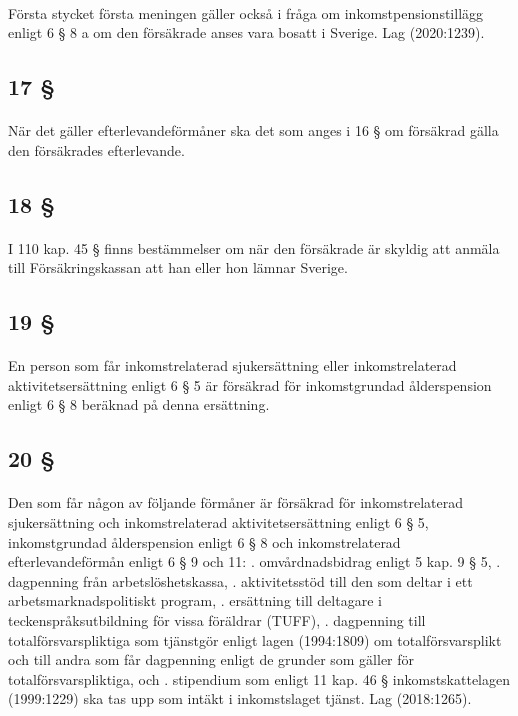 \documentclass[a4paper,notitlepage,openany,10pt]{book}
\begin{document}
\paragraph*{}
Första stycket första meningen gäller också i fråga om inkomstpensionstillägg enligt 6 § 8 a om den försäkrade anses vara bosatt i Sverige.
Lag (2020:1239).
\subsection*{17 §}
\paragraph*{}
När det gäller efterlevandeförmåner ska det som anges i 16 § om försäkrad gälla den försäkrades efterlevande.
\subsection*{18 §}
\paragraph*{}
I 110 kap. 45 § finns bestämmelser om när den försäkrade är skyldig att anmäla till Försäkringskassan att han eller hon lämnar Sverige.
\subsection*{19 §}
\paragraph*{}
En person som får inkomstrelaterad sjukersättning eller inkomstrelaterad aktivitetsersättning enligt 6 § 5 är försäkrad för inkomstgrundad ålderspension enligt 6 § 8 beräknad på denna ersättning.
\subsection*{20 §}
\paragraph*{}
Den som får någon av följande förmåner är försäkrad för inkomstrelaterad sjukersättning och inkomstrelaterad aktivitetsersättning enligt 6 § 5, inkomstgrundad ålderspension enligt 6 § 8 och inkomstrelaterad efterlevandeförmån enligt 6 § 9 och 11:
. omvårdnadsbidrag enligt 5 kap. 9 § 5,
. dagpenning från arbetslöshetskassa,
. aktivitetsstöd till den som deltar i ett arbetsmarknadspolitiskt program,
. ersättning till deltagare i teckenspråksutbildning för vissa föräldrar (TUFF),
. dagpenning till totalförsvarspliktiga som tjänstgör enligt lagen (1994:1809) om totalförsvarsplikt och till andra som får dagpenning enligt de grunder som gäller för totalförsvarspliktiga, och
. stipendium som enligt 11 kap. 46 § inkomstskattelagen (1999:1229) ska tas upp som intäkt i inkomstslaget tjänst.
Lag (2018:1265).
\end{document}
